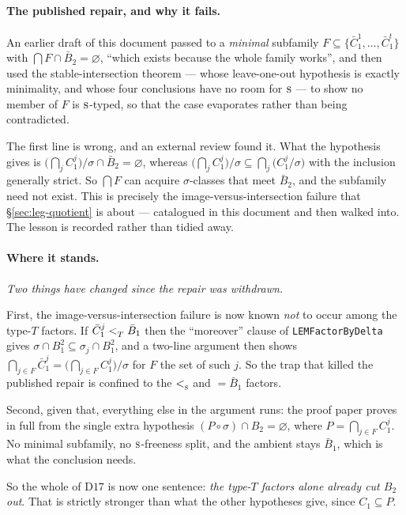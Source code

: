 \paragraph{The published repair, and why it fails.}
An earlier draft of this document passed to a \emph{minimal} subfamily
$F\subseteq\{\bar C_{1}^{1},\dots,\bar C_{1}^{t}\}$ with $\bigcap F\cap
\bar B_{2}=\varnothing$, ``which exists because the whole family works'', and
then used the stable-intersection theorem --- whose leave-one-out hypothesis is
exactly minimality, and whose four conclusions have no room for $\textup{\textsc{s}}$ --- to
show no member of $F$ is $\textup{\textsc{s}}$-typed, so that the case evaporates rather than
being contradicted.

The first line is wrong, and an external review found it. What the hypothesis
gives is $\bigl(\bigcap_{j}C_{1}^{j}\bigr)/\sigma\cap\bar B_{2}=\varnothing$,
whereas $\bigl(\bigcap_{j}C_{1}^{j}\bigr)/\sigma\subseteq
\bigcap_{j}\bigl(C_{1}^{j}/\sigma\bigr)$ with the inclusion generally strict.
So $\bigcap F$ can acquire $\sigma$-classes that meet $\bar B_{2}$, and the
subfamily need not exist. This is precisely the image-versus-intersection
failure that \S\ref{sec:leg-quotient} is about --- catalogued in this document
and then walked into. The lesson is recorded rather than tidied away.

\paragraph{Where it stands.}
\emph{Two things have changed since the repair was withdrawn.}

First, the image-versus-intersection failure is now known \emph{not} to occur
among the type-$T$ factors. If $\bar C_{1}^{j}<_{T}^{}\bar B_{1}$ then the
``moreover'' clause of \texttt{LEMFactorByDelta} gives
$\sigma\cap B_{1}^{2}\subseteq\sigma_{j}\cap B_{1}^{2}$, and a two-line
argument then shows
$\bigcap_{j\in F}\bar C_{1}^{j}=\bigl(\bigcap_{j\in F}C_{1}^{j}\bigr)/\sigma$
for $F$ the set of such $j$. So the trap that killed the published repair is
confined to the $<_{\textup{\textsc{s}}}^{}$ and $=\bar B_{1}$ factors.

Second, given that, everything else in the argument runs: the proof paper
proves  in full from the single extra hypothesis
$(P\circ\sigma)\cap B_{2}=\varnothing$, where
$P=\bigcap_{j\in F}C_{1}^{j}$. No minimal subfamily, no $\textup{\textsc{s}}$-freeness split,
and the ambient stays $\bar B_{1}$, which is what the conclusion needs.

So the whole of $\mathrm D17$ is now one sentence: \emph{the type-$T$ factors
alone already cut $B_{2}$ out}. That is strictly stronger than what the other
hypotheses give, since $C_{1}\subseteq P$.


